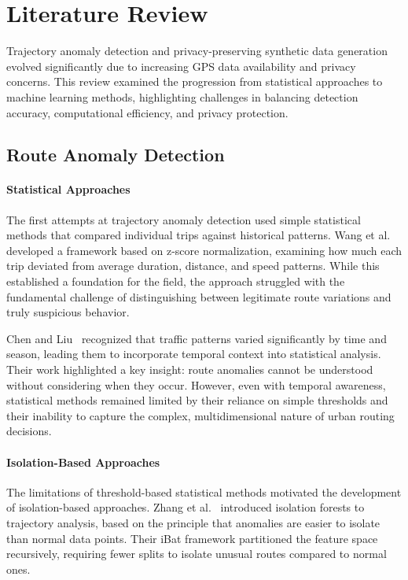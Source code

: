 \documentclass[runningheads]{llncs}
\begin{document}
\section{Literature Review}
\label{sec:literature-review}

Trajectory anomaly detection and privacy-preserving synthetic data generation evolved significantly due to increasing GPS data availability and privacy concerns. This review examined the progression from statistical approaches to machine learning methods, highlighting challenges in balancing detection accuracy, computational efficiency, and privacy protection.

\subsection{Route Anomaly Detection}
\label{sec:detection-review}

\paragraph{Statistical Approaches}
The first attempts at trajectory anomaly detection used simple statistical methods that compared individual trips against historical patterns. Wang et al.~\cite{wang2020statistical} developed a framework based on z-score normalization, examining how much each trip deviated from average duration, distance, and speed patterns. While this established a foundation for the field, the approach struggled with the fundamental challenge of distinguishing between legitimate route variations and truly suspicious behavior.

Chen and Liu~\cite{chen2021temporal} recognized that traffic patterns varied significantly by time and season, leading them to incorporate temporal context into statistical analysis. Their work highlighted a key insight: route anomalies cannot be understood without considering when they occur. However, even with temporal awareness, statistical methods remained limited by their reliance on simple thresholds and their inability to capture the complex, multidimensional nature of urban routing decisions.

\paragraph{Isolation-Based Approaches}
The limitations of threshold-based statistical methods motivated the development of isolation-based approaches. Zhang et al.~\cite{zhang2019ibat} introduced isolation forests to trajectory analysis, based on the principle that anomalies are easier to isolate than normal data points. Their iBat framework partitioned the feature space recursively, requiring fewer splits to isolate unusual routes compared to normal ones.
\end{document}
